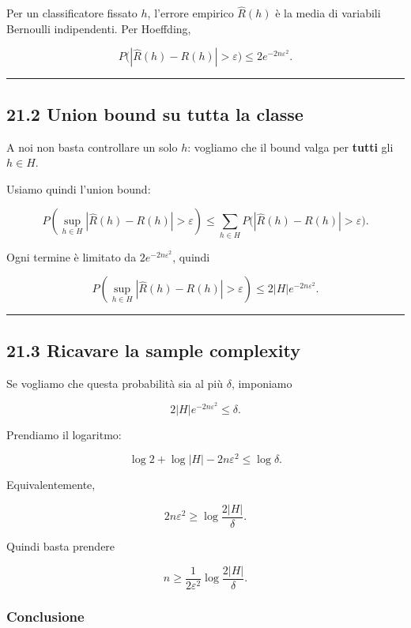 \documentclass{article}
\begin{document}
Per un classificatore fissato \(h\), l'errore empirico \(\hat R(h)\) è
la media di variabili Bernoulli indipendenti. Per Hoeffding,

\[
P\big(|\hat R(h)-R(h)|>\varepsilon\big)
\le
2e^{-2n\varepsilon^2}.
\]

\begin{center}\rule{0.5\linewidth}{0.5pt}\end{center}

\subsection{21.2 Union bound su tutta la
classe}\label{union-bound-su-tutta-la-classe}

A noi non basta controllare un solo \(h\): vogliamo che il bound valga
per \textbf{tutti} gli \(h\in H\).

Usiamo quindi l'union bound:

\[
P\left(\sup_{h\in H}|\hat R(h)-R(h)|>\varepsilon\right)
\le
\sum_{h\in H} P\big(|\hat R(h)-R(h)|>\varepsilon\big).
\]

Ogni termine è limitato da \(2e^{-2n\varepsilon^2}\), quindi

\[
P\left(\sup_{h\in H}|\hat R(h)-R(h)|>\varepsilon\right)
\le
2|H|e^{-2n\varepsilon^2}.
\]

\begin{center}\rule{0.5\linewidth}{0.5pt}\end{center}

\subsection{21.3 Ricavare la sample
complexity}\label{ricavare-la-sample-complexity}

Se vogliamo che questa probabilità sia al più \(\delta\), imponiamo

\[
2|H|e^{-2n\varepsilon^2}\le \delta.
\]

Prendiamo il logaritmo:

\[
\log 2 + \log |H| - 2n\varepsilon^2 \le \log \delta.
\]

Equivalentemente,

\[
2n\varepsilon^2 \ge \log \frac{2|H|}{\delta}.
\]

Quindi basta prendere

\[
n \ge \frac{1}{2\varepsilon^2}\log\frac{2|H|}{\delta}.
\]

\subsubsection{Conclusione}\label{conclusione-10}
\end{document}
